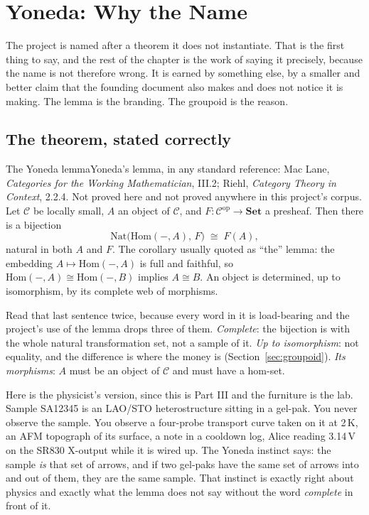 \chapter{Yoneda: Why the Name}

The project is named after a theorem it does not instantiate. That is the first thing to say, and the rest of the chapter is the work of saying it precisely, because the name is not therefore wrong. It is earned by something else, by a smaller and better claim that the founding document also makes and does not notice it is making. The lemma is the branding. The groupoid is the reason.

\section{The theorem, stated correctly}

\begin{Theorem}{The Yoneda lemma}{Yoneda's lemma, in any standard reference: Mac Lane, \textit{Categories for the Working Mathematician}, III.2; Riehl, \textit{Category Theory in Context}, 2.2.4. Not proved here and not proved anywhere in this project's corpus.}
Let $\mathcal{C}$ be locally small, $A$ an object of $\mathcal{C}$, and $F: \mathcal{C}^{\mathrm{op}} \to \mathbf{Set}$ a presheaf. Then there is a bijection
\[ \mathrm{Nat}\big(\mathrm{Hom}(-,A),\, F\big) \;\cong\; F(A), \]
natural in both $A$ and $F$. The corollary usually quoted as ``the'' lemma: the embedding $A \mapsto \mathrm{Hom}(-,A)$ is full and faithful, so $\mathrm{Hom}(-,A) \cong \mathrm{Hom}(-,B)$ implies $A \cong B$. An object is determined, up to isomorphism, by its complete web of morphisms.
\end{Theorem}

Read that last sentence twice, because every word in it is load-bearing and the project's use of the lemma drops three of them. \emph{Complete}: the bijection is with the whole natural transformation set, not a sample of it. \emph{Up to isomorphism}: not equality, and the difference is where the money is (Section~\ref{sec:groupoid}). \emph{Its morphisms}: $A$ must be an object of $\mathcal{C}$ and must have a hom-set.

Here is the physicist's version, since this is Part III and the furniture is the lab. Sample SA12345 is an LAO/STO heterostructure sitting in a gel-pak. You never observe the sample. You observe a four-probe transport curve taken on it at 2\,K, an AFM topograph of its surface, a note in a cooldown log, Alice reading 3.14\,V on the SR830 X-output while it is wired up. The Yoneda instinct says: the sample \emph{is} that set of arrows, and if two gel-paks have the same set of arrows into and out of them, they are the same sample. That instinct is exactly right about physics and exactly what the lemma does not say without the word \emph{complete} in front of it.

